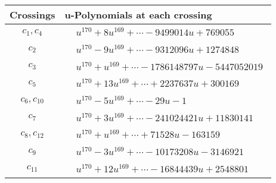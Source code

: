 \documentclass[1p]{elsarticle_modified}
\theoremstyle{definition}
\begin{document}
\begin{tabular}{m{50pt}|m{274pt}}
Crossings & \hspace{64pt}u-Polynomials at each crossing \\
\hline $$\begin{aligned}c_{1},c_{4}\end{aligned}$$&$\begin{aligned}
&u^{170}+8 u^{169}+\cdots-9499014 u+769055
\end{aligned}$\\
\hline $$\begin{aligned}c_{2}\end{aligned}$$&$\begin{aligned}
&u^{170}-9 u^{169}+\cdots-9312096 u+1274848
\end{aligned}$\\
\hline $$\begin{aligned}c_{3}\end{aligned}$$&$\begin{aligned}
&u^{170}+u^{169}+\cdots-1786148797 u-5447052019
\end{aligned}$\\
\hline $$\begin{aligned}c_{5}\end{aligned}$$&$\begin{aligned}
&u^{170}+13 u^{169}+\cdots+2237637 u+300169
\end{aligned}$\\
\hline $$\begin{aligned}c_{6},c_{10}\end{aligned}$$&$\begin{aligned}
&u^{170}-5 u^{169}+\cdots-29 u-1
\end{aligned}$\\
\hline $$\begin{aligned}c_{7}\end{aligned}$$&$\begin{aligned}
&u^{170}+3 u^{169}+\cdots-241024421 u+11830141
\end{aligned}$\\
\hline $$\begin{aligned}c_{8},c_{12}\end{aligned}$$&$\begin{aligned}
&u^{170}+u^{169}+\cdots+71528 u-163159
\end{aligned}$\\
\hline $$\begin{aligned}c_{9}\end{aligned}$$&$\begin{aligned}
&u^{170}-3 u^{169}+\cdots-10173208 u-3146921
\end{aligned}$\\
\hline $$\begin{aligned}c_{11}\end{aligned}$$&$\begin{aligned}
&u^{170}+12 u^{169}+\cdots-16844439 u+2548801
\end{aligned}$\\
\hline
\end{tabular}\\~\\
\end{document}
